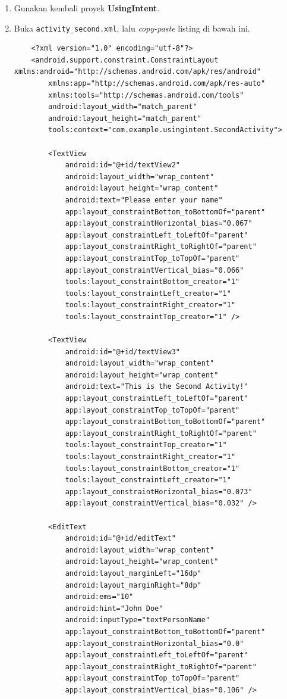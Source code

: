 \documentclass{scrartcl}
\begin{document}
\begin{enumerate}
	\item Gunakan kembali proyek \textbf{UsingIntent}.
	\item Buka \texttt{activity\_second.xml}, lalu \textit{copy-paste} listing di bawah ini.
	
	\begin{verbatim}
	<?xml version="1.0" encoding="utf-8"?>
	<android.support.constraint.ConstraintLayout xmlns:android="http://schemas.android.com/apk/res/android"
		xmlns:app="http://schemas.android.com/apk/res-auto"
		xmlns:tools="http://schemas.android.com/tools"
		android:layout_width="match_parent"
		android:layout_height="match_parent"
		tools:context="com.example.usingintent.SecondActivity">
		
		<TextView
			android:id="@+id/textView2"
			android:layout_width="wrap_content"
			android:layout_height="wrap_content"
			android:text="Please enter your name"
			app:layout_constraintBottom_toBottomOf="parent"
			app:layout_constraintHorizontal_bias="0.067"
			app:layout_constraintLeft_toLeftOf="parent"
			app:layout_constraintRight_toRightOf="parent"
			app:layout_constraintTop_toTopOf="parent"
			app:layout_constraintVertical_bias="0.066"
			tools:layout_constraintBottom_creator="1"
			tools:layout_constraintLeft_creator="1"
			tools:layout_constraintRight_creator="1"
			tools:layout_constraintTop_creator="1" />
		
		<TextView
			android:id="@+id/textView3"
			android:layout_width="wrap_content"
			android:layout_height="wrap_content"
			android:text="This is the Second Activity!"
			app:layout_constraintLeft_toLeftOf="parent"
			app:layout_constraintTop_toTopOf="parent"
			app:layout_constraintBottom_toBottomOf="parent"
			app:layout_constraintRight_toRightOf="parent"
			tools:layout_constraintTop_creator="1"
			tools:layout_constraintRight_creator="1"
			tools:layout_constraintBottom_creator="1"
			tools:layout_constraintLeft_creator="1"
			app:layout_constraintHorizontal_bias="0.073"
			app:layout_constraintVertical_bias="0.032" />
		
		<EditText
			android:id="@+id/editText"
			android:layout_width="wrap_content"
			android:layout_height="wrap_content"
			android:layout_marginLeft="16dp"
			android:layout_marginRight="8dp"
			android:ems="10"
			android:hint="John Doe"
			android:inputType="textPersonName"
			app:layout_constraintBottom_toBottomOf="parent"
			app:layout_constraintHorizontal_bias="0.0"
			app:layout_constraintLeft_toLeftOf="parent"
			app:layout_constraintRight_toRightOf="parent"
			app:layout_constraintTop_toTopOf="parent"
			app:layout_constraintVertical_bias="0.106" />
		

\end{verbatim}
\end{enumerate}
\end{document}
